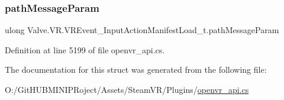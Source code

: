 \subsubsection{\texorpdfstring{pathMessageParam}{pathMessageParam}}
{\footnotesize\ttfamily ulong Valve.\+V\+R.\+V\+R\+Event\+\_\+\+Input\+Action\+Manifest\+Load\+\_\+t.\+path\+Message\+Param}



Definition at line 5199 of file openvr\+\_\+api.\+cs.



The documentation for this struct was generated from the following file\+:\begin{DoxyCompactItemize}
\item 
O\+:/\+Git\+H\+U\+B\+M\+I\+N\+I\+P\+Roject/\+Assets/\+Steam\+V\+R/\+Plugins/\mbox{\hyperlink{openvr__api_8cs}{openvr\+\_\+api.\+cs}}\end{DoxyCompactItemize}
